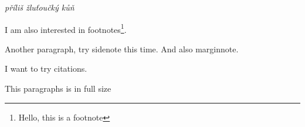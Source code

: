 \documentclass[]{tufte-book}
\begin{document}
  \textit{příliš žluťoučký kůň} \kant[3]

I am also interested in footnotes\footnote{Hello, this is a footnote}. \kant[4]

Another paragraph, try sidenote this time. And also marginnote.

I want to try citations\cite{Tufte2001,Tufte1990,Tufte1997,Tufte2006}.

\begin{fullwidth}
  This paragraphs is in full size \kant[5]
 \end{fullwidth}





\end{document}
